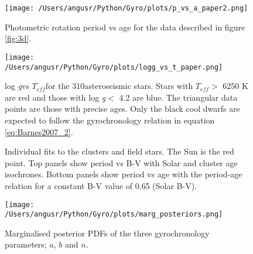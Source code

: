 \documentclass[10pt,preprint]{aastex}
\newcommand{\logg}{log \emph{g}}
\newcommand{\teff}{$T_{eff}$}
\newcommand{\nastero}{310}
\begin{document}
\begin{figure}[ht]
\begin{center}
\texttt{[image: /Users/angusr/Python/Gyro/plots/p\_vs\_a\_paper2.png]}
\caption{Photometric rotation period vs age for the data described in figure \ref{fig:3d}.}
\label{fig:p_vs_a}
\end{center}
\end{figure}

\begin{figure}[ht]
\begin{center}
\texttt{[image: /Users/angusr/Python/Gyro/plots/logg\_vs\_t\_paper.png]}
\caption{\logg vs \teff for the \nastero asteroseismic stars. Stars with \teff $>$ 6250 K are red and those with \logg $<$ 4.2 are blue. The triangular data points are those with precise ages. Only the black cool dwarfs are expected to follow the gyrochronology relation in equation \ref{eq:Barnes2007_2}.}
\label{fig:p_vs_a}
\end{center}
\end{figure}

\begin{figure}[ht]
\begin{center}
    \end{center}
    \caption{ Individual fits to the clusters and field stars. The Sun is the red point. Top panels show period vs B-V with Solar and cluster age isochrones. Bottom panels show period vs age with the period-age relation for a constant B-V value of 0.65 (Solar B-V).}
   \label{fig:subfigures2}
\end{figure}

\begin{figure}[ht]
\begin{center}
\texttt{[image: /Users/angusr/Python/Gyro/plots/marg\_posteriors.png]}
\caption{Marginalised posterior PDFs of the three gyrochronology parameters; $a$, $b$ and $n$.}
\label{fig:marg_posteriors}
\end{center}
\end{figure}
\end{document}
